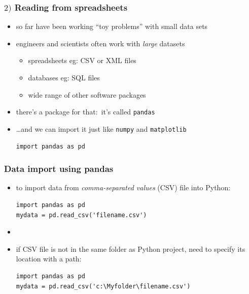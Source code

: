 \documentclass[english,14pt]{beamer}
\newcommand\red[1]{{\color{red} #1}}
\begin{document}

\begin{frame}[fragile]

\frametitle{$2)$ Reading from spreadsheets}

\begin{itemize}
    \item so far have been working ``toy problems'' with small data sets
    \item engineers and scientists often work with \emph{large} datasets
        \begin{itemize}
            \item spreadsheets eg: CSV or XML files
            \item databases eg: SQL files 
            \item wide range of other software packages
        \end{itemize}
    \item there's a package for that:~it's called \texttt{pandas}
    \item[] \ldots and we can import it just like \texttt{numpy} and \texttt{matplotlib}
\begin{lstlisting}[style=CStyle]
import pandas as pd
\end{lstlisting}
\end{itemize}

\end{frame}


\begin{frame}[fragile]

\frametitle{Data import using pandas}
\begin{itemize}
    
    \item to import data from \red{\emph{comma-separated values}} (CSV) file into Python:
\begin{lstlisting}[style=CStyle]
import pandas as pd
mydata = pd.read_csv('filename.csv')
\end{lstlisting}

	\item[]

	\item if CSV file is not in the same folder as Python project, need to specify its location with a path:
\begin{lstlisting}[style=CStyle]
import pandas as pd
mydata = pd.read_csv('c:\Myfolder\filename.csv')
\end{lstlisting}
\end{itemize}

\end{frame}
\end{document}

